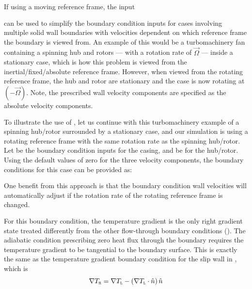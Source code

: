 If using a moving reference frame, the input
%
\begin{InputExample}
  \item[{\BCinpBC[nmlBC::BCInput/IsSpecifiedInMRF]{Is\_Specified\_In\_MRF}}]
\end{InputExample}
%
can be used to simplify the boundary condition inputs for cases involving
multiple solid wall boundaries with velocities dependent on which reference
frame the boundary is viewed from.
%
An example of this would be a turbomachinery fan containing a spinning hub and
rotors --- with a rotation rate of $\vec{\Omega}$ --- inside a stationary case,
which is how this problem is viewed from the inertial\slash fixed\slash absolute
reference frame.
%
However, when viewed from the rotating reference frame, the hub and rotor are
stationary and the case is now rotating at $(-\vec{\Omega})$.
%
Note, the prescribed wall velocity components are specified as the absolute
velocity components.


To illustrate the use of , let us continue
with this turbomachinery example of a spinning hub\slash rotor surrounded by a
stationary case, and our simulation is using a rotating reference frame with
the same rotation rate as the spinning hub\slash rotor.
%
Let \BCinptext[1]{} be the boundary condition inputs for the casing,
and \BCinptext[2]{} be for the hub\slash rotor.
%
Using the default values of zero for the three velocity components, the boundary
conditions for this case can be provided as:
%
\begin{InputExample}
  \item[{\BCinptext[1]{Is\_Specified\_In\_MRF}} = \fls]
  \item[{\BCinptext[2]{Is\_Specified\_In\_MRF}} = \tru]
\end{InputExample}
%
One benefit from this approach is that the boundary condition wall velocities
will automatically adjust if the rotation rate of the rotating reference frame
is changed.


For this boundary condition, the temperature gradient is the only right gradient
state treated differently from the other flow-through boundary conditions
().
%
The adiabatic condition prescribing zero heat flux through the boundary requires
the temperature gradient to be tangential to the boundary surface.
%
This is exactly the same as the temperature gradient boundary condition for the
slip wall in , which is
%
\begin{equation*}
  \nabla T_{\textsc{r}} = \nabla T_{\textsc{l}}
                 - \left(\nabla T_{\textsc{l}}\cdot\hat{n}\right)\hat{n}
\end{equation*}

